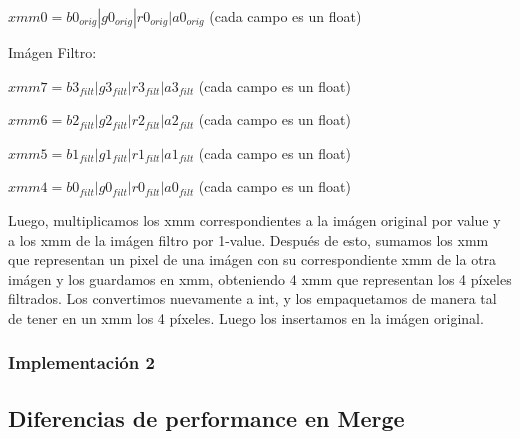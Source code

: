 \documentclass[a4paper]{article}
\begin{document}
$xmm0 = b0_{orig} | g0_{orig} | r0_{orig} | a0_{orig}$   (cada campo es un float)

\vspace*{0.3cm}

Imágen Filtro:

\vspace*{0.3cm}

$xmm7 = b3_{filt} | g3_{filt} | r3_{filt} | a3_{filt}$   (cada campo es un float)

\vspace*{0.3cm}

$xmm6 = b2_{filt} | g2_{filt} | r2_{filt} | a2_{filt}$   (cada campo es un float)

\vspace*{0.3cm}

$xmm5 = b1_{filt} | g1_{filt} | r1_{filt} | a1_{filt}$   (cada campo es un float)

\vspace*{0.3cm}

$xmm4 = b0_{filt} | g0_{filt} | r0_{filt} | a0_{filt}$   (cada campo es un float)

\vspace*{0.3cm}

Luego, multiplicamos los xmm correspondientes a la imágen original por value y a los xmm de la imágen filtro por 1-value. Después de esto, sumamos los xmm que representan un pixel de una imágen con su correspondiente xmm de la otra imágen y los guardamos en xmm, obteniendo 4 xmm que representan los 4 píxeles filtrados. Los convertimos nuevamente a int, y los empaquetamos de manera tal de tener en un xmm los 4 píxeles. Luego los insertamos en la imágen original.

\vspace*{0.3cm}

\subsubsection{Implementación 2}



\subsection{Diferencias de performance en Merge}
\end{document}
